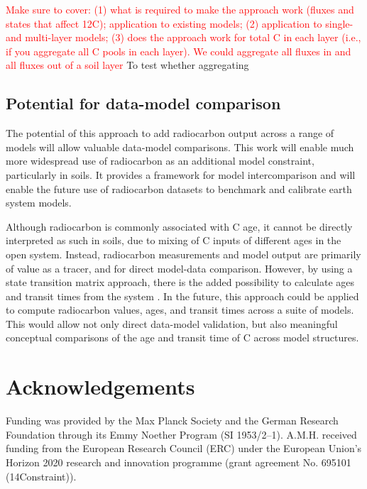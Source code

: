 \documentclass[11pt,a4paper]{article}
\newcommand{\red}[1]{\textcolor{red}{#1}}
\begin{document}
\red{Make sure to cover: (1) what is required to make the approach work (fluxes and states that affect 12C); application to existing models; (2) application to single- and multi-layer models; (3) does the approach work for total C in each layer (i.e., if you aggregate all C pools in each layer). We could aggregate all fluxes in and all fluxes out of a soil layer}
To test whether aggregating 
\subsection{Potential for data-model comparison}

The potential of this approach to add radiocarbon output across a range of models will allow valuable data-model comparisons. This work will enable much more widespread use of radiocarbon as an additional model constraint, particularly in soils. It provides a framework for model intercomparison and will enable the future use of radiocarbon datasets to benchmark and calibrate earth system models.

Although radiocarbon is commonly associated with C age, it cannot be directly interpreted as such in soils, due to mixing of C inputs of different ages in the open system. Instead, radiocarbon measurements and model output are primarily of value as a tracer, and for direct model-data comparison. However, by using a state transition matrix approach, there is the added possibility to calculate ages and transit times from the system \citep{Metzler2018PNAS}. In the future, this approach could be applied to compute radiocarbon values, ages, and transit times across a suite of models. This would allow not only direct data-model validation, but also meaningful conceptual comparisons of the age and transit time of C across model structures. 


\section*{Acknowledgements}
Funding was provided by the Max Planck Society and the German Research Foundation through its Emmy Noether Program (SI 1953/2--1). A.M.H. received funding from the European Research Council (ERC) under the European Union’s Horizon 2020 research and innovation programme (grant agreement No. 695101 (14Constraint)).   


%

\end{document}

